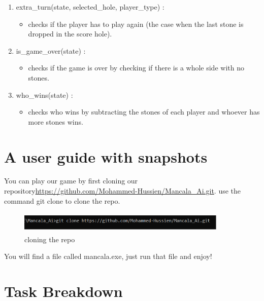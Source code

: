\begin{enumerate}
    \item extra\_turn(state, selected\_hole, player\_type)   :
    \begin{itemize}
        \item checks if the player has to play again (the case when the last stone is
          dropped in the score hole).
    \end{itemize}



    \item is\_game\_over(state)    :
    \begin{itemize}
        \item checks if the game is over by checking if there is a whole side with no stones.
    \end{itemize}


    \item who\_wins(state)     :
    \begin{itemize}
        \item checks who wins by subtracting the stones of each player and whoever has more stones wins.
    \end{itemize}


    
\end{enumerate}       




\section{A user guide with snapshots}
You can play our game by first cloning our repository\url{https://github.com/Mohammed-Hussien/Mancala_Ai.git}. 
use the command git clone to clone the repo.

\begin{figure}[H]
    \centering
    \includegraphics[width=100mm,height=10mm]{Images/git_clone.png}
    \caption{cloning the repo}
  \end{figure}
  \vskip 0.2in
\vskip 0.2in
You will find a file called mancala.exe, just run that file and enjoy!




\section{Task Breakdown}

